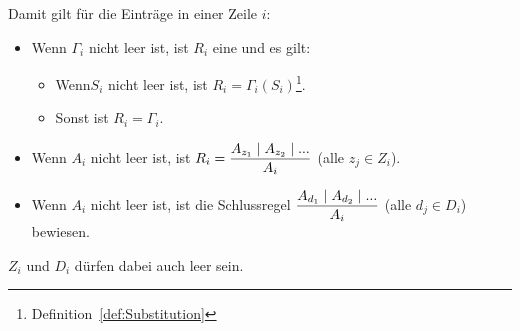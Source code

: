 Damit gilt für die Einträge in einer Zeile $i$:
\begin{itemize}
	\item Wenn $\Gamma_i$ nicht leer ist, ist $R_i$ eine  und es gilt:
	\begin{itemize}
		\item Wenn$S_i$ nicht leer ist, ist $R_i = \Gamma_i(S_i)$\footnote{\seename Definition~\vref{def:Substitution}}.
		\item Sonst ist $R_i = \Gamma_i$.
	\end{itemize}
	\item Wenn $A_i$ nicht leer ist, ist $R_i = \dfrac{A_{z_1} \mid A_{z_2} \mid ...}{A_i}$ (alle $z_j \in Z_i$).
	\item Wenn $A_i$ nicht leer ist, ist die Schlussregel $\dfrac{A_{d_1} \mid A_{d_2} \mid ...}{A_i}$ (alle $d_j \in D_i$) bewiesen.
\end{itemize}
$Z_i$ und $D_i$ dürfen dabei auch leer sein.

